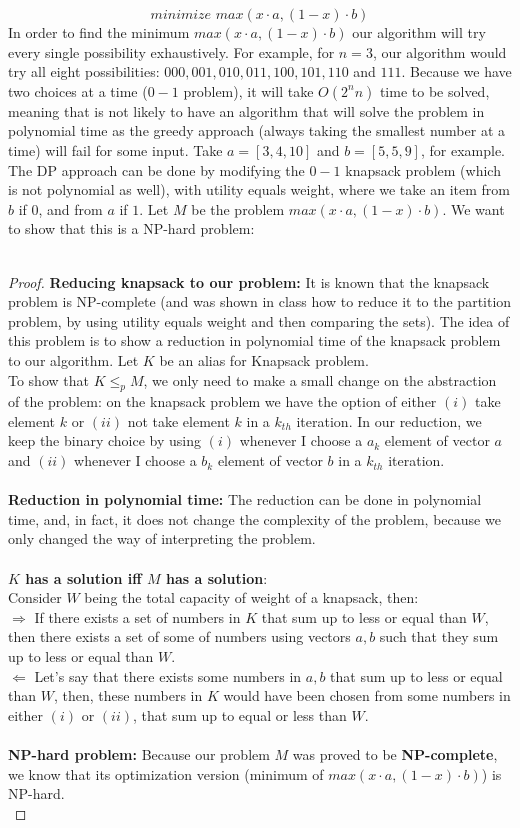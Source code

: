 \documentclass{article}
\begin{document}
$$
\textit{minimize } max(x \cdot a, (1-x) \cdot b)
$$
In order to find the minimum $max(x \cdot a, (1-x) \cdot b)$ our algorithm will try every single possibility exhaustively. For example, for $n = 3$, our algorithm would try all eight possibilities: $000, 001, 010, 011, 100, 101, 110$ and $111$. Because we have two choices at a time ($0-1$ problem), it will take $O(2^n n)$ time to be solved, meaning that is not likely to have an algorithm that will solve the problem in polynomial time as the greedy approach (always taking the smallest number at a time) will fail for some input. Take $a=[3, 4, 10]$ and $b=[5,5,9]$, for example. The DP approach can be done by modifying the $0-1$ knapsack problem (which is not polynomial as well), with utility equals weight, where we take an item from $b$ if $0$, and from $a$ if $1$. Let $M$ be the problem $max(x \cdot a, (1-x) \cdot b)$. We want to show that this is a NP-hard problem:
\\
\\
\begin{proof}
\textbf{Reducing knapsack to our problem:} It is known that the knapsack problem is NP-complete (and was shown in class how to reduce it to the partition problem, by using utility equals weight and then comparing the sets). The idea of this problem is to show a reduction in polynomial time of the knapsack problem to our algorithm. Let $K$ be an alias for Knapsack problem. 
\\
To show that $K \leq_{p} M$, we only need to make a small change on the abstraction of the problem: on the knapsack problem we have the option of either $(i)$ take element $k$ or $(ii)$ not take element $k$ in a $k_{th}$ iteration. In our reduction, we keep the binary choice by using $(i)$ whenever I choose a $a_k$ element of vector $a$ and $(ii)$ whenever I choose a $b_k$ element of vector $b$ in a $k_{th}$ iteration.
\\
\\
\textbf{Reduction in polynomial time:} The reduction can be done in polynomial time, and, in fact, it does not change the complexity of the problem, because we only changed the way of interpreting the problem.
\\
\\
\textbf{$K$ has a solution iff $M$ has a solution}:
\\
Consider $W$ being the total capacity of weight of a knapsack, then:
\\
$\Longrightarrow $ If there exists a set of numbers in $K$ that sum up to less or equal than $W$, then there exists a set of some of numbers using vectors $a, b$ such that they sum up to less or equal than $W$.
\\
$\Longleftarrow $ Let’s say that there exists some numbers in $a, b$ that sum up to less or equal than $W$, then, these numbers in $K$ would have been chosen from some numbers in either $(i)$ or $(ii)$, that sum up to equal or less than $W$.
\\
\\
\textbf{NP-hard problem:} Because our problem $M$ was proved to be \textbf{NP-complete}, we know that its optimization version (minimum of $max(x \cdot a, (1-x) \cdot b)$) is NP-hard.
\\
\end{proof}
\end{document}
